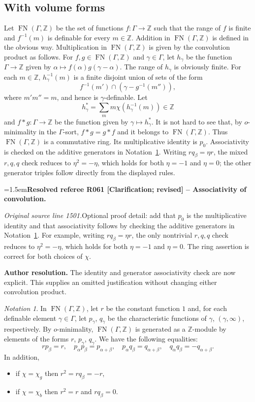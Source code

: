 \documentclass[12pt]{amsart}
\newcommand{\ResolvedRefereeRemark}[5]{%
  \par\medskip\begingroup\normalfont\small\color{gray}%
  \emergencystretch=1.5em\noindent\textbf{Resolved referee R#1 [#2] -- #3.}\par\nobreak\noindent #4\par
  \medskip\color{ResolutionGreen}\noindent\textbf{Author resolution.} #5\par
  \endgroup\medskip
}
\theoremstyle{plain}
\theoremstyle{definition}
\theoremstyle{remark}
\newtheorem{nota}[thm]{Notation}
\numberwithin{equation}{section}
\theoremstyle{plain}
\newcommand{\Z}{\mathds{Z}}
\newcommand{\omin}{$o$\nobreakdash}
\newcommand{\0}{\emptyset}
\newcommand{\fun}{\longrightarrow}
\newcommand{\efun}{\longmapsto}
\DeclareMathOperator{\fn}{FN}
\begin{document}
\subsection{With volume forms}
Let $\fn(\Gamma, \Z)$ be the set of functions $f: \Gamma \fun \Z$ such that the range of $f$ is finite and $f^{-1}(m)$ is definable for every $m \in \Z$. Addition in $\fn(\Gamma, \Z)$ is defined in the obvious way. Multiplication in $\fn(\Gamma, \Z)$ is given by the convolution product as follows. For $f, g \in \fn(\Gamma, \Z)$ and $\gamma \in \Gamma$, let $h_\gamma$ be the function $\Gamma \fun \Z$ given by $\alpha \efun f(\alpha)g(\gamma - \alpha)$. The range of $h_\gamma$ is obviously finite. For each $m \in \Z$, $h_\gamma^{-1}(m)$ is a finite disjoint union of sets of the form
\[
f^{-1}(m') \cap (\gamma - g^{-1}(m'')),
\]
where $m' m'' = m$, and hence is $\gamma$-definable. Let
\[
 h_\gamma^* = \sum_{m} m \chi(h_\gamma^{-1}(m)) \in \Z
\]
and $f * g : \Gamma \fun \Z$ be the function  given by $\gamma \efun h_\gamma^*$. It is not hard to see that, by \omin-minimality in the $\Gamma$-sort, $f * g = g * f$ and it belongs to $\fn(\Gamma, \Z)$. Thus $\fn(\Gamma, \Z)$ is a commutative ring. Its multiplicative identity is $p_0$. Associativity is checked on the additive generators in Notation~\ref{gam:equ:cons}. Writing $rq_\beta=\eta r$, the mixed $r,q,q$ check reduces to $\eta^2=-\eta$, which holds for both $\eta=-1$ and $\eta=0$; the other generator triples follow directly from the displayed rules.

\ResolvedRefereeRemark{061}{Clarification; revised}{Associativity of convolution}{%
\textit{Original source line 1501.}\quad Optional proof detail: add that $p_0$ is the multiplicative identity and that associativity follows by checking the additive generators in Notation~\ref{gam:equ:cons}. For example, writing $rq_\beta=\eta r$, the only nontrivial $r,q,q$ check reduces to $\eta^2=-\eta$, which holds for both $\eta=-1$ and $\eta=0$. The ring assertion is correct for both choices of $\chi$.
}{The identity and generator associativity check are now explicit. This supplies an omitted justification without changing either convolution product.}

\begin{nota}\label{gam:equ:cons}
In $\fn(\Gamma, \Z)$, let $r$ be the constant function $1$ and, for each definable element $\gamma \in \Gamma$, let $p_{\gamma}$,  $q_{\gamma}$ be the characteristic functions of $\gamma$, $(\gamma, \infty)$, respectively. By \omin-minimality, $\fn(\Gamma, \Z)$ is generated as a $\Z$-module by elements of the forms $r$, $p_\gamma$, $q_\gamma$. We have the following equalities:
\[
r p_\beta   = r, \quad p_\alpha p_\beta = p_{\alpha+ \beta}, \quad p_\alpha q_\beta  = q_{\alpha+ \beta}, \quad q_\alpha q_\beta = - q_{\alpha+ \beta}.
\]
In addition,
\begin{itemize}
  \item if $\chi = \chi_{g}$ then $r^2 = r q_\beta = - r$,
  \item if $\chi = \chi_{b}$ then $r^2 = r$ and $r q_\beta = 0$.
\end{itemize}
\end{nota}
\end{document}
